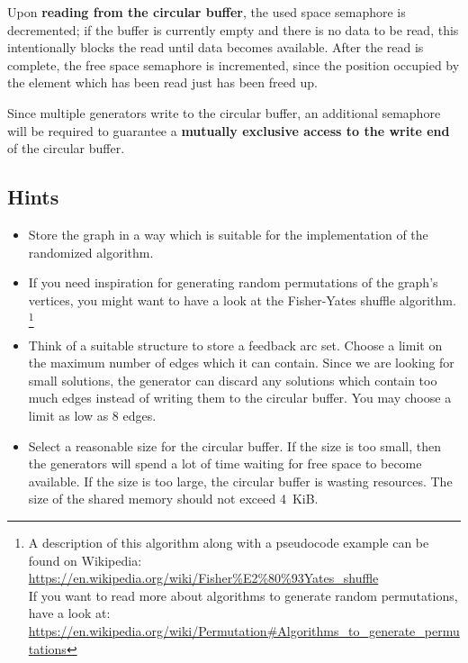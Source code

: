 Upon \textbf{reading from the circular buffer}, the used space semaphore is decremented;
if the buffer is currently empty and there is no data to be read,
this intentionally blocks the read until data becomes available.
After the read is complete, the free space semaphore is incremented,
since the position occupied by the element which has been read just has been freed up.

Since multiple generators write to the circular buffer,
an additional semaphore will be required
to guarantee a \textbf{mutually exclusive access to the write end} of the circular buffer.

\subsection*{Hints}
\begin{itemize}
\item Store the graph in a way which is suitable for the implementation of the randomized algorithm.

\item If you need inspiration for generating random permutations of the graph's vertices,
you might want to have a look at the Fisher-Yates shuffle algorithm.
\footnote{
A description of this algorithm along with a pseudocode example can be found on Wikipedia:\\
\url{https://en.wikipedia.org/wiki/Fisher\%E2\%80\%93Yates_shuffle}\\
If you want to read more about algorithms to generate random permutations, have a look at:\\
\url{https://en.wikipedia.org/wiki/Permutation\#Algorithms_to_generate_permutations}
}

\item Think of a suitable structure to store a feedback arc set.
Choose a limit on the maximum number of edges which it can contain.
Since we are looking for small solutions,
the generator can discard any solutions which contain too much edges
instead of writing them to the circular buffer.
You may choose a limit as low as 8 edges.

\item Select a reasonable size for the circular buffer.
If the size is too small,
then the generators will spend a lot of time waiting for free space to become available.
If the size is too large,
the circular buffer is wasting resources.
The size of the shared memory should not exceed 4~KiB.

\end{itemize}

